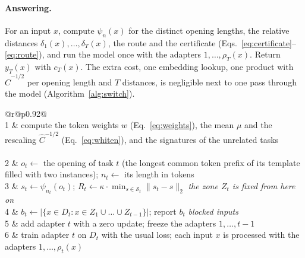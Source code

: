 \paragraph{Answering.} For an input $x$, compute $\psi_{n}(x)$ for the distinct opening lengths, the
relative distances $\delta_1(x), \dots, \delta_T(x)$, the route and the certificate
(Eqs.~\eqref{eq:certificate}--\eqref{eq:route}), and run the model once with the adapters
$1, \dots, \rho_T(x)$. Return $y_T(x)$ with $c_T(x)$. The extra cost, one embedding lookup, one
product with $\hat C^{-1/2}$ per opening length and $T$ distances, is negligible next to one pass
through the model (Algorithm~\ref{alg:switch}).

\begin{algorithm}
  \caption{The certified switch}
  \label{alg:switch}
  \small
  \begin{tabular}{@{}r@{\hspace{0.8em}}p{0.92\linewidth}@{}}
     \\[1pt]
    1 & compute the token weights $w$ (Eq.~\ref{eq:weights}), the mean $\mu$ and the rescaling $\hat{C}^{-1/2}$ (Eq.~\ref{eq:whiten}), and the
        signatures of the unrelated tasks \\[4pt]
     \\[1pt]
    2 & $o_t \leftarrow$ the opening of task $t$ (the longest common token prefix of its template filled with two instances); \quad $n_t \leftarrow$ its length in tokens \\
    3 & $s_t \leftarrow \psi_{n_t}(o_t)$; \quad $R_t \leftarrow \kappa \cdot \min_{s \in \mathcal{S}_t} \lVert s_t - s \rVert_2$
        \hfill \emph{the zone $Z_t$ is fixed from here on} \\
    4 & $b_t \leftarrow \bigl|\{x \in D_t : x \in Z_1 \cup \dots \cup Z_{t-1}\}\bigr|$; \quad report $b_t$
        \hfill \emph{blocked inputs} \\
    5 & add adapter $t$ with a zero update; freeze the adapters $1, \dots, t-1$ \\
    6 & train adapter $t$ on $D_t$ with the usual loss; each input $x$ is processed with the adapters $1, \dots, \rho_t(x)$ \\[4pt]
     \\[1pt]

\end{tabular}
\end{algorithm}
